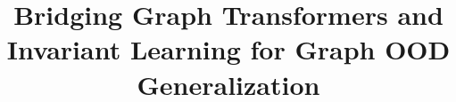 \documentclass[a4paper,fleqn]{cas-dc}
\begin{document}
\let\WriteBookmarks\relax
\def\floatpagepagefraction{1}
\def\textpagefraction{.001}
\let\printorcid\relax %



\title[mode = title]{Bridging Graph Transformers and Invariant Learning for Graph OOD Generalization}  



%








\end{document}
